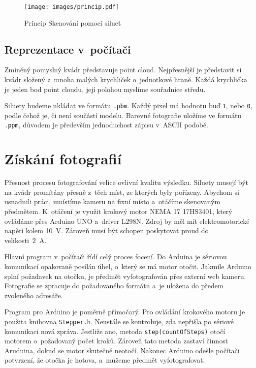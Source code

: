 \documentclass[12pt]{report}			%
\begin{document}
                \begin{figure}[h]
                    \centering
                    \texttt{[image: images/princip.pdf]}
                    \caption{Princip Skenování pomocí siluet}
                \end{figure}

	            \subsection{Reprezentace v~počítači}
	                Zmíněný pomyslný kvádr představuje point cloud. Nejpřesnější je představit si kvádr složený z~mnoha malých krychliček o~jednotkové hraně. Každá krychlička je jeden bod point cloudu, její polohou myslíme souřadnice středu.

	                Siluety budeme ukládat ve formátu \verb|.pbm|. Každý pixel má hodnotu buď \verb|1|, nebo \verb|0|, podle čehož je, či není součástí modelu. Barevné fotografie uložíme ve formátu \verb|.ppm|, důvodem je především jednoduchost zápisu v~ASCII podobě.

    	    \section{Získání fotografií}

	            Přesnost procesu fotografování velice ovlivní kvalitu výsledku. Siluety musejí být na kvádr promítány přesně z~těch míst, ze kterých byly pořízeny. Abychom si usnadnili práci, umístíme kameru na fixní místo a~otáčíme skenovaným předmětem. K~otáčení je využit krokový motor NEMA 17 17HS3401, který ovládáme přes Arduino UNO a~driver L298N. Zdroj by měl mít elektromotorické napětí kolem \SI{10}{\volt}. Zároveň musí být schopen poskytovat proud do velikosti~\SI{2}{\ampere}.

                Hlavní program v~počítači řídí celý proces focení. Do Arduina je sériovou komunikací opakovaně posílán úhel, o~který se má motor otočit. Jakmile Arduino splní požadavek na otočku, je předmět vyfotografován přes externí web kameru. Fotografie se zpracuje do požadovaného formátu a~je uložena do předem zvoleného adresáře.

                Program pro Arduino je poměrně přímočarý. Pro ovládání krokového motoru je použita knihovna \verb|Stepper.h|. Neustále se kontroluje, zda nepřišla po sériové komunikaci nová zpráva. Jestliže ano, metoda \verb|step(countOfSteps)| otočí motorem o~požadovaný počet kroků. Zároveň tato metoda zastaví činnost Aruduina, dokud se motor skutečně neotočí. Nakonec Arduino odešle počítači potvrzení, že otočka je hotova, a~můžeme předmět vyfotografovat.
\end{document}
